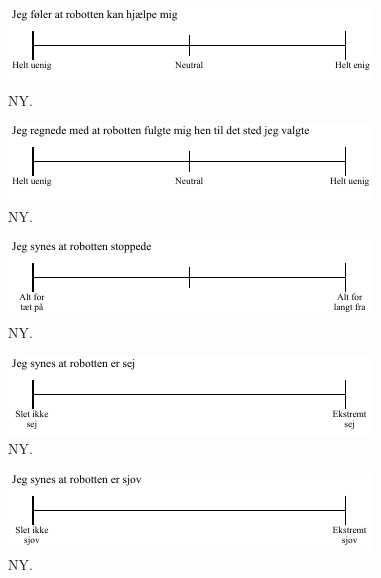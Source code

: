 %
\begin{figure}[H]
\centering
\includegraphics[width =\textwidth]{Figure/UdvalgteSkalaer/RobottenKanHjaelpe} 
\caption{NY.}
\label{fig:SkalaRKanHjaelpe}
\end{figure}
\noindent
%

%
\begin{figure}[H]
\centering
\includegraphics[width =\textwidth]{Figure/UdvalgteSkalaer/RobottenFulgteMigDetRigtigeStedHen} 
\caption{NY.}
\label{fig:SkalaRFulgteMigDetRigtigeStedHen}
\end{figure}
\noindent
%

%
\begin{figure}[H]
\centering
\includegraphics[width =\textwidth]{Figure/UdvalgteSkalaer/RStoppede} 
\caption{NY.}
\label{fig:SkalaRStoppede}
\end{figure}
\noindent
%

%
\begin{figure}[H]
\centering
\includegraphics[width =\textwidth]{Figure/UdvalgteSkalaer/SejR} 
\caption{NY.}
\label{fig:SkalaSejR}
\end{figure}
\noindent
%

%
\begin{figure}[H]
\centering
\includegraphics[width =\textwidth]{Figure/UdvalgteSkalaer/SjovR} 
\caption{NY.}
\label{fig:SkalaSjovR}
\end{figure}
\noindent
%

